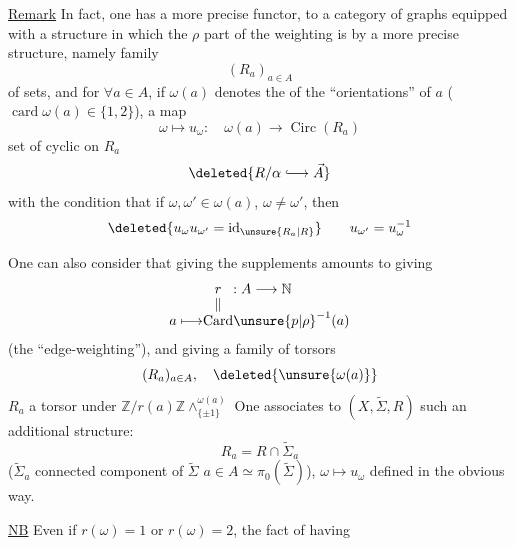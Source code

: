 \uline{Remark} In fact, one has a more precise functor, to a category of graphs equipped with a structure in which the $\rho$ part of the weighting is    by a more precise structure, namely   family
\[
 (R_a)_{a\in A}
\]
of sets, and for $\forall a\in A$, if $\omega(a)$ denotes the  of the
 
``orientations'' of $a$ ($\operatorname{card}\omega(a)\in\{1,2\}$), a map
\[
 \omega\longmapsto u_\omega:\quad \omega(a)\longrightarrow\operatorname{Circ}(R_a)
\]
set of cyclic  on $R_a$
\[
 \deleted{R/\alpha\lhook\joinrel\longrightarrow\vec A}
\]
with the condition that if $\omega,\omega'\in\omega(a)$, $\omega\ne\omega'$, then
\[
 \deleted{u_\omega u_{\omega'}=\operatorname{id}_{\unsure{R_a|R}}}
 \qquad u_{\omega'}=u_\omega^{-1}
\]

One can also consider that giving the supplements amounts to giving
\[
 \begin{array}{r@{}c@{}l}
 &r&:A\longrightarrow\mathbb N\\[-.3ex]
 &\Vert&\\[-.3ex]
 a\longmapsto&\operatorname{Card}&\unsure{p|\rho}^{-1}(a)
 \end{array}
\]
(the ``edge-weighting''), and giving a family of torsors
\[
 (R_a)_{a\in A},\quad \deleted{\unsure{\omega(a)}}
\]
$R_a$ a torsor under $\mathbb Z/r(a)\mathbb Z\mathbin{\wedge}^{\omega(a)}_{\{\pm1\}}$
One associates to $(X,\widetilde\Sigma,R)$ such an additional structure:
\[
 R_a=R\cap\widetilde\Sigma_a
\]
($\widetilde\Sigma_a$  connected component of $\widetilde\Sigma$   $a\in A\simeq\pi_0(\widetilde\Sigma)$),
 
$\omega\longmapsto u_\omega$ defined in the obvious way.

\uline{NB} Even if $r(\omega)=1$ or $r(\omega)=2$, the fact of having
